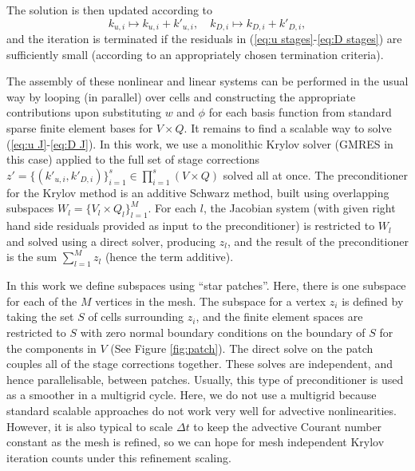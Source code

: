 \documentclass[a4paper]{article}
\begin{document}
The solution is then updated according to
\begin{equation}
  k_{u,i}\mapsto k_{u,i} + k'_{u,i}, \quad
  k_{D,i}\mapsto k_{D,i} + k'_{D,i},
\end{equation}
and the iteration is terminated if the residuals in (\ref{eq:u
  stages}-\ref{eq:D stages}) are sufficiently small (according
to an appropriately chosen termination criteria).

The assembly of these nonlinear and linear systems can be performed in
the usual way by looping (in parallel) over cells and constructing the
appropriate contributions upon substituting $w$ and $\phi$ for each
basis function from standard sparse finite element bases for $V\times
Q$. It remains to find a scalable way to solve (\ref{eq:u J}-\ref{eq:D
  J}). In this work, we use a monolithic Krylov solver (GMRES in this
case) applied to the full set of stage corrections $z' = \{(k'_{u,i},
k'_{D,i})\}_{i=1}^s \in \prod_{i=1}^s(V\times Q)$ solved all at
once. The preconditioner for the Krylov method is an additive Schwarz
method, built using overlapping subspaces $W_l=\{V_l\times
Q_l\}_{l=1}^M$. For each $l$, the Jacobian system (with given right
hand side residuals provided as input to the preconditioner) is
restricted to $W_l$ and solved using a direct solver, producing $z_l$,
and the result of the preconditioner is the sum $\sum_{l=1}^Mz_l$
(hence the term additive).

In this work we define subspaces using ``star patches''.  Here, there
is one subspace for each of the $M$ vertices in the mesh.  The
subspace for a vertex $z_i$ is defined by taking the set $S$ of cells
surrounding $z_i$, and the finite element spaces are restricted to $S$
with zero normal boundary conditions on the boundary of $S$ for the
components in $V$ (See Figure \ref{fig:patch}). The direct solve on
the patch couples all of the stage corrections together. These
solves are independent, and hence parallelisable, between patches.
Usually, this
type of preconditioner is used as a smoother in a multigrid
cycle. Here, we do not use a multigrid because standard scalable
approaches do not work very well for advective
nonlinearities. However, it is also typical to scale $\Delta t$ to
keep the advective Courant number constant as the mesh is refined, so
we can hope for mesh independent Krylov iteration counts under this
refinement scaling.
\end{document}
